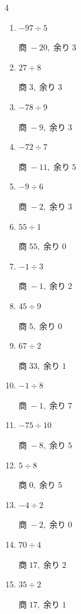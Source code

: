 \begin{multicols}{4}
\begin{enumerate}
        $商\; 13,\; 余り\; 3$

  \item $-97 \div 5$

        $商\; -20,\; 余り\; 3$

  \item $27 \div 8$

        $商\; 3,\; 余り\; 3$

  \item $-78 \div 9$

        $商\; -9,\; 余り\; 3$

  \item $-72 \div 7$

        $商\; -11,\; 余り\; 5$

  \item $-9 \div 6$

        $商\; -2,\; 余り\; 3$

  \item $55 \div 1$

        $商\; 55,\; 余り\; 0$

  \item $-1 \div 3$

        $商\; -1,\; 余り\; 2$

  \item $45 \div 9$

        $商\; 5,\; 余り\; 0$

  \item $67 \div 2$

        $商\; 33,\; 余り\; 1$

  \item $-1 \div 8$

        $商\; -1,\; 余り\; 7$

  \item $-75 \div 10$

        $商\; -8,\; 余り\; 5$

  \item $5 \div 8$

        $商\; 0,\; 余り\; 5$

  \item $-4 \div 2$

        $商\; -2,\; 余り\; 0$

  \item $70 \div 4$

        $商\; 17,\; 余り\; 2$

  \item $35 \div 2$

        $商\; 17,\; 余り\; 1$


\end{enumerate}
\end{multicols}
